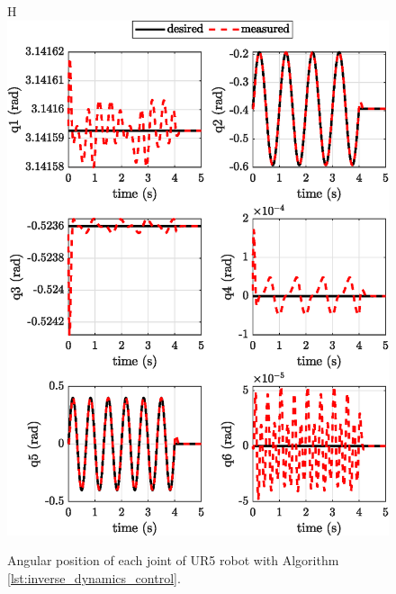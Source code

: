 \begin{figure}{H}
    \centering
    \includegraphics{images/act_2.1/joint_position.eps}
    \caption{Angular position of each joint of UR5 robot with Algorithm \ref{lst:inverse_dynamics_control}.}
    \label{fig:act_2.1_joint_position}
\end{figure}

